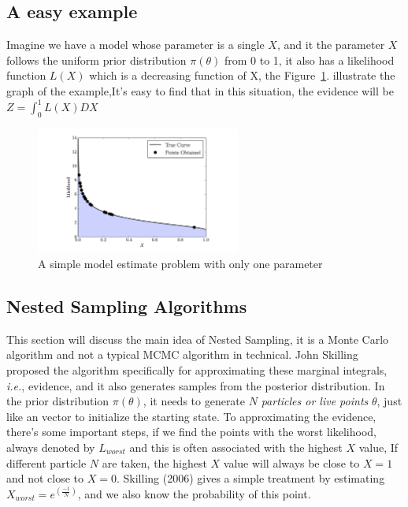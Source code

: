 \documentclass[11pt]{book}
\begin{document}
\subsection{A easy example}
Imagine we have a model whose parameter is a single $X$, and it the parameter $X$ follows the uniform prior distribution
$\pi(\theta)$ from 0 to 1, it also has a likelihood function $L(X)$ which is a decreasing function of X, the Figure~\ref{fig:example1}. illustrate the graph of the example,It's easy to find that in this situation, 
the evidence will be $Z = \int ^ 1 _0L(X)DX$
\begin{center}
	\begin{figure}
			\centering
			\includegraphics[width=0.6\textwidth]{example1}
			\caption{A simple model estimate problem with only one parameter}
			\label{fig:example1}
	\end{figure}
	\end{center}
\subsection{Nested Sampling Algorithms}
This section will discuss the main idea of Nested Sampling, it is a Monte Carlo algorithm and not a 
typical MCMC algorithm in technical. John Skilling proposed the algorithm specifically for approximating these marginal integrals, \textit{i.e.}, evidence, and it also generates samples from the posterior distribution. 
In the prior distribution $\pi(\theta)$, it needs to generate $N$ \textit{particles or live points} $\theta$, just like an vector to initialize the starting state.
To approximating the evidence, there's some important steps, if we find the points with the worst likelihood,
always denoted by $L_{worst}$ and this is often associated with the highest $X$ value, If different particle $N$ are taken, 
the highest $X$ value will always be close to $X = 1$ and not close to $X = 0$. 
Skilling (2006) gives a simple treatment by estimating $X_{worst} = e^{(\frac{-1}{N})}$, 
and we also know the probability of this point.
\end{document}
